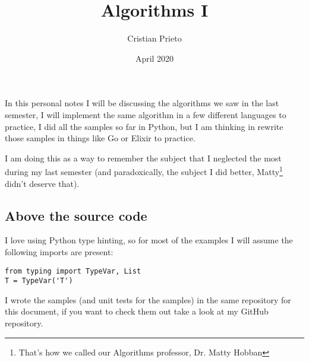 \documentclass{scrartcl}
\title{Algorithms I}
\author{Cristian Prieto}
\date{April 2020}
\begin{document}
\maketitle

In this personal notes I will be discussing the algorithms we saw in the last semester, I will implement the same algorithm in a few different languages to practice, I did all the samples so far in Python, but I am thinking in rewrite those samples in things like Go or Elixir to practice.

I am doing this as a way to remember the subject that I neglected the most during my last semester (and paradoxically, the subject I did better, Matty\footnote{That's how we called our Algorithms professor, Dr. Matty Hobban} didn't deserve that).

\subsection*{Above the source code}

I love using Python type hinting, so for most of the examples I will assume the following imports are present:

\begin{verbatim}
from typing import TypeVar, List
T = TypeVar('T')
\end{verbatim}

I wrote the samples (and unit tests for the samples) in the same repository for this document, if you want to check them out take a look at my GitHub repository.


\end{document}
